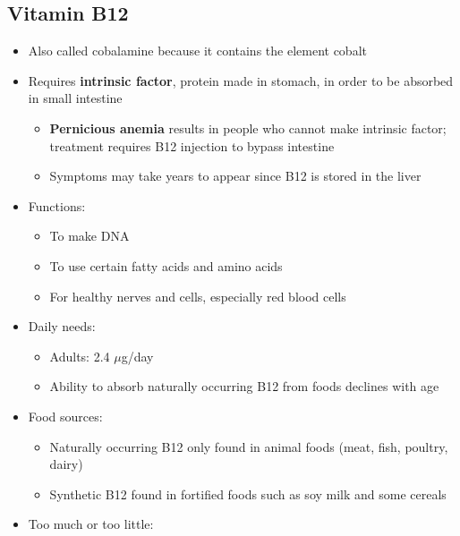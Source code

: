 \documentclass[12pt]{article}
\begin{document}
        \subsection{Vitamin B12}
            \begin{itemize}
                \item Also called cobalamine because it contains the element cobalt
                \item Requires \textbf{intrinsic factor}, protein made in stomach, in order to be absorbed in small intestine
                    \begin{itemize}
                        \item \textbf{Pernicious anemia} results in people who cannot make intrinsic factor; treatment requires B12 injection to bypass intestine
                        \item Symptoms may take years to appear since B12 is stored in the liver
                    \end{itemize}
                \item Functions:
                    \begin{itemize}
                        \item To make DNA
                        \item To use certain fatty acids and amino acids
                        \item For healthy nerves and cells, especially red blood cells
                    \end{itemize}
                \item Daily needs:
                    \begin{itemize}
                        \item Adults: 2.4 $\mu$g/day
                        \item Ability to absorb naturally occurring B12 from foods declines with age
                    \end{itemize}
                \item Food sources:
                    \begin{itemize}
                        \item Naturally occurring B12 only found in animal foods (meat, fish, poultry, dairy)
                        \item Synthetic B12 found in fortified foods such as soy milk and some cereals
                    \end{itemize}
                \item Too much or too little:

\end{itemize}
\end{document}
